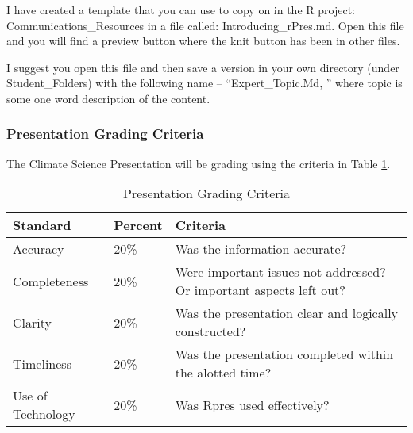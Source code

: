 I have created a template that you can use to copy on in the R project: Communications\_Resources in a file called: Introducing\_rPres.md. Open this file and you will find a preview button where the knit button has been in other files. 

I suggest you open this file and then save a version in your own directory (under Student\_Folders) with the following name -- ``Expert\_Topic.Md, '' where topic is some one word description of the content.

\subsubsection{Presentation Grading Criteria}

The Climate Science Presentation will be grading using the criteria in Table \ref{tab:presentationgrading}.

\begin{table}[h]
\centering
\caption{Presentation Grading Criteria}
\label{tab:presentationgrading}
\begin{tabular}{llp{2.5in}}\hline
Standard            & Percent & Criteria \\ \hline\hline    
Accuracy            & 20\%    & Was the information accurate?\\
Completeness        & 20\%    & Were important issues not addressed? Or important aspects left out?\\
Clarity             & 20\% & Was the presentation clear and logically constructed?\\
Timeliness          & 20\% & Was the presentation completed within the alotted time? \\
Use of Technology   & 20\% & Was Rpres used effectively?\\ \hline
\end{tabular}
\end{table}